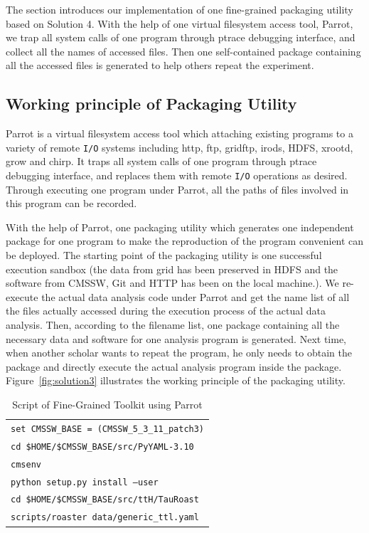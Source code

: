 \documentclass{acm_proc_article-sp}
\begin{document}
The section introduces our implementation of one fine-grained packaging utility based on Solution 4. With the help of one
virtual filesystem access tool, Parrot, we trap all system calls of one
program through ptrace debugging interface, and collect all the names of accessed files. 
Then one self-contained package containing all the accessed files is generated to help others repeat the experiment.

\subsection{Working principle of Packaging Utility} 

Parrot is a virtual filesystem access tool which attaching existing programs to
a variety of remote {\tt I/O} systems including http, ftp, gridftp, irods, HDFS,
xrootd, grow and chirp. It traps all system calls of one program through ptrace
debugging interface, and replaces them with remote {\tt I/O} operations as desired.
Through executing one program under Parrot, all the paths of files involved in
this program can be recorded.  

With the help of Parrot, one packaging utility which generates one independent
package for one program to make the reproduction of the program convenient can
be deployed. The starting point of the packaging utility is one successful execution
sandbox (the data from grid has been preserved in HDFS and the software from
CMSSW, Git and HTTP has been on the local machine.). We re-execute the actual
data analysis code under Parrot and get the name list of all the files actually
accessed during the execution process of the actual data analysis. Then,
according to the filename list, one package containing all the necessary data
and software for one analysis program is generated. Next time, when another
scholar wants to repeat the program, he only needs to obtain the package and
directly execute the actual analysis program inside the package. 
Figure~\ref{fig:solution3} illustrates the working principle of the packaging utility.

\begin{table}
    \centering
    \begin{tabular}{|l|}
        \hline
        {\tt set CMSSW\_BASE = (CMSSW\_5\_3\_11\_patch3)} \\
        {\tt cd \$HOME/\$CMSSW\_BASE/src/PyYAML-3.10}\\
        {\tt cmsenv} \\
        {\tt python setup.py install --user} \\
        {\tt cd \$HOME/\$CMSSW\_BASE/src/ttH/TauRoast}\\
        {\tt scripts/roaster data/generic\_ttl.yaml} \\
        \hline
    \end{tabular}
    \caption{Script of Fine-Grained Toolkit using Parrot}
    \label{table:parrot-script}
\end{table}
\end{document}
